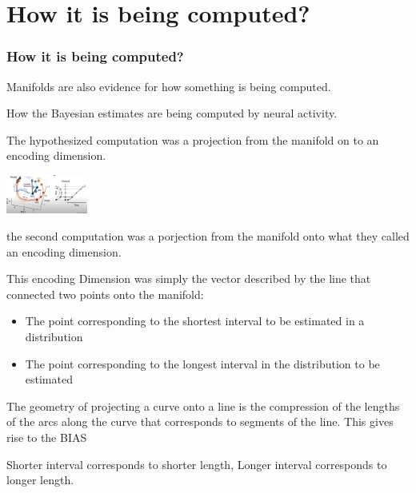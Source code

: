\documentclass{beamer}
\begin{document}

\section{How it is being computed?}
\begin{frame}
\frametitle{\textbf{How it is being computed?} }


Manifolds are also evidence for how something is being computed.

How the Bayesian estimates are being computed by neural activity.

The hypothesized computation was a projection from the manifold on to an encoding dimension.


\centering
\begin{minipage}{1\textwidth}
    \centering
    \includegraphics[width=0.2\textwidth]{images/Sohn_et_al-2019_05.PNG} %
\end{minipage}

the second computation was a porjection from the manifold onto what they called an encoding dimension.

This encoding Dimension was simply the vector described by the line that connected two points onto the manifold:

\begin{itemize}
    \item The point corresponding to the shortest interval to be estimated in a distribution
    \item The point corresponding to the longest interval in the distribution to be estimated
\end{itemize}

The geometry of projecting a curve onto a line is the compression of the lengths of the arcs along the curve that corresponds to segments of the line. This gives rise to the BIAS

Shorter interval corresponds to shorter length, Longer interval corresponds to longer length.


\end{frame}
\end{document}
